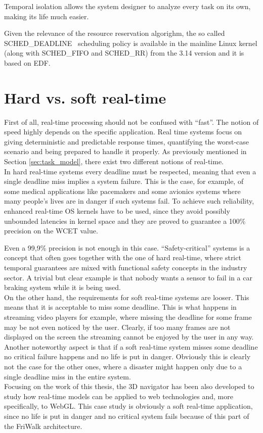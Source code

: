 Temporal isolation allows the system designer to analyze every
task on its own, making its life much easier.

Given the relevance of the resource reservation algorighm, the so called
SCHED\_DEADLINE~\cite{lelli2016deadline} scheduling policy is available
in the mainline Linux kernel (along with SCHED\_FIFO and SCHED\_RR) from the
3.14 version and it is based on EDF.


\section{Hard vs. soft real-time}
First of all, real-time processing should not be confused with ``fast''. The notion
of speed highly depends on the specific application. Real time systems focus on
giving deterministic and predictable response times, quantifying the worst-case
scenario and being prepared to handle it properly. As previously mentioned in Section \ref{sec:task_model}, there exist two different
notions of real-time.\\
In hard real-time systems every deadline must be respected, meaning
that even a single deadline miss implies a system failure. This is the case, for
example, of some medical applications like pacemakers and some avionics systems
where many people's lives are in danger if such systems fail. To achieve such
reliability, enhanced real-time OS kernels have to be used, since they avoid
possibly unbounded latencies in kernel space and they are proved to guarantee
a 100\% precision on the WCET value. 

Even a 99,9\% precision is not
enough in this case. ``Safety-critical'' systems is a concept that often goes
together with the one of hard real-time, where strict temporal guarantees are
mixed with functional safety concepts in the industry sector. A trivial but clear
example is that nobody wants a sensor to fail in a car braking system while
it is being used.\\
On the other hand, the requirements for soft real-time systems are looser. This
means that it is acceptable to miss some deadline.
This is what happens in streaming video players for example, where missing the
deadline for some frame may be not even noticed by the user. Clearly, if too many
frames are not displayed on the screen the streaming cannot be enjoyed by the
user in any way. Another noteworthy aspect is that if a soft real-time system
misses some deadline no critical failure happens and no life is put in danger.
Obviously this is clearly not the case for the other ones, where a disaster
might happen only due to a single deadline miss in the entire system.\\
Focusing on the work of this thesis, the 3D navigator has been also developed 
to study how
real-time models can be applied to web technologies and, more specifically, to
WebGL. This case study is obviously a soft real-time application, since
no life is put in danger and no critical system fails because of this part of
the FriWalk architecture.
